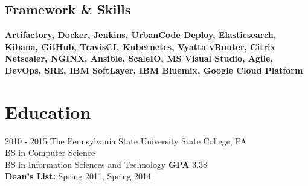 \documentclass[]{friggeri-cv}
\begin{document}
\begin{aside}
  \section{Framework \& Skills}
    \textbf{Artifactory, Docker, Jenkins, UrbanCode Deploy, Elasticsearch, Kibana, GitHub, TravisCI, Kubernetes, Vyatta vRouter, Citrix Netscaler, NGINX, Ansible, ScaleIO, MS Visual Studio, Agile, DevOps, SRE, IBM SoftLayer, IBM Bluemix, Google Cloud Platform}
\end{aside}


\section{Education}
\begin{entrylist}
  \entry
    {2010 - 2015}
    {The Pennsylvania State University \hfill \hfill State College, PA}
    {\\BS in Computer Science \\BS in Information Sciences and Technology}
    {\textbf{GPA} 3.38\\
    \textbf{Dean's List:} Spring 2011, Spring 2014}

\end{entrylist}
\end{document}
